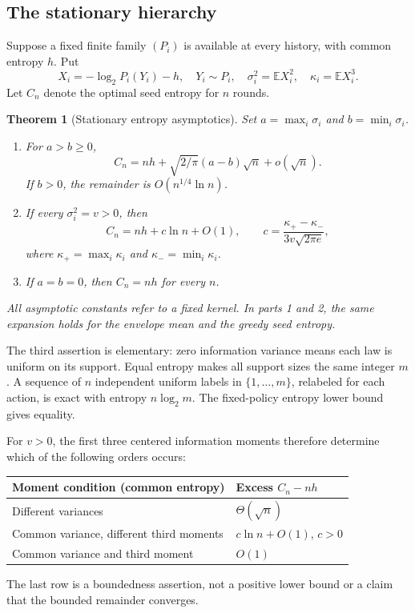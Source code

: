 \documentclass[11pt,a4paper]{article}
\newtheorem{theorem}{Theorem}[section]
\theoremstyle{definition}\newtheorem{definition}[theorem]{Definition}
\theoremstyle{remark}\newtheorem{remark}[theorem]{Remark}
\newcommand{\E}{\mathbb E}
\numberwithin{equation}{section}
\begin{document}
\subsection{The stationary hierarchy}
Suppose a fixed finite family $(P_i)$ is available at every history, with
common entropy $h$. Put
\[
 X_i=-\log_2P_i(Y_i)-h,\quad Y_i\sim P_i,\quad
 \sigma_i^2=\E X_i^2,\quad \kappa_i=\E X_i^3.
\]
Let $C_n$ denote the optimal seed entropy for $n$ rounds.
\begin{theorem}[Stationary entropy asymptotics]\label{thm:hierarchy}
Set $a=\max_i\sigma_i$ and $b=\min_i\sigma_i$.
\begin{enumerate}
\item For $a>b\ge0$,
\[
 C_n=nh+\sqrt{2/\pi}(a-b)\sqrt n+o(\sqrt n).
\]
If $b>0$, the remainder is $O(n^{1/4}\ln n)$.
\item If every $\sigma_i^2=v>0$, then
\begin{equation}\label{eq:logmain}
 \boxed{C_n=nh+c\ln n+O(1),\qquad
 c=\frac{\kappa_+-\kappa_-}{3v\sqrt{2\pi e}},}
\end{equation}
where $\kappa_+=\max_i\kappa_i$ and $\kappa_-=\min_i\kappa_i$.
\item If $a=b=0$, then $C_n=nh$ for every $n$.
\end{enumerate}
All asymptotic constants refer to a fixed kernel. In parts 1 and 2,
the same expansion holds for the envelope mean and the greedy seed entropy.
\end{theorem}
The third assertion is elementary: zero information variance means each
law is uniform on its support. Equal entropy makes all support sizes the
same integer $m$. A sequence of $n$ independent uniform labels in
$\{1,\ldots,m\}$, relabeled for each action, is exact with entropy $n\log_2m$.
The fixed-policy entropy lower bound gives equality.

For $v>0$, the first three centered information moments therefore determine
which of the following orders occurs:
\begin{center}
\begin{tabular}{ll}
\toprule
Moment condition (common entropy) & Excess $C_n-nh$ \\
\midrule
Different variances & $\Theta(\sqrt n)$ \\
Common variance, different third moments & $c\ln n+O(1)$, $c>0$ \\
Common variance and third moment & $O(1)$ \\
\bottomrule
\end{tabular}
\end{center}
The last row is a boundedness assertion, not a positive lower bound or a
claim that the bounded remainder converges.
\end{document}
